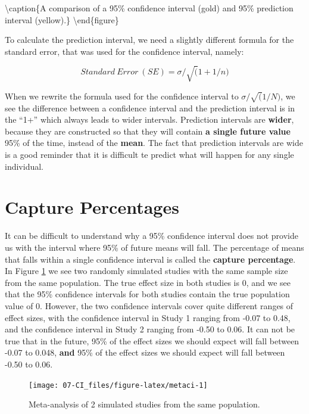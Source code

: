 \documentclass[
]{krantz}
\begin{document}
\textbackslash caption\{A comparison of a 95\% confidence interval (gold) and 95\% prediction interval (yellow).\}\label{fig:predictioninterval}
\textbackslash end\{figure\}

To calculate the prediction interval, we need a slightly different formula for the standard error, that was used for the confidence interval, namely:

\[
Standard \ Error \ (SE) = \sigma/\sqrt(1+1/n)
\]

When we rewrite the formula used for the confidence interval to \(\sigma/\sqrt(1/N)\), we see the difference between a confidence interval and the prediction interval is in the ``1+'' which always leads to wider intervals. Prediction intervals are \textbf{wider}, because they are constructed so that they will contain \textbf{a single future value} 95\% of the time, instead of the \textbf{mean}. The fact that prediction intervals are wide is a good reminder that it is difficult te predict what will happen for any single individual.

\hypertarget{capture-percentages}{%
\section{Capture Percentages}\label{capture-percentages}}

It can be difficult to understand why a 95\% confidence interval does not provide us with the interval where 95\% of future means will fall. The percentage of means that falls within a single confidence interval is called the \textbf{capture percentage}. In Figure \ref{fig:metaci} we see two randomly simulated studies with the same sample size from the same population. The true effect size in both studies is 0, and we see that the 95\% confidence intervals for both studies contain the true population value of 0. However, the two confidence intervals cover quite different ranges of effect sizes, with the confidence interval in Study 1 ranging from -0.07 to 0.48, and the confidence interval in Study 2 ranging from -0.50 to 0.06. It can not be true that in the future, 95\% of the effect sizes we should expect will fall between -0.07 to 0.048, \textbf{and} 95\% of the effect sizes we should expect will fall between -0.50 to 0.06.

\begin{figure}

{\centering \texttt{[image: 07-CI\_files/figure-latex/metaci-1]} 

}

\caption{Meta-analysis of 2 simulated studies from the same population.}\label{fig:metaci}
\end{figure}
\end{document}
